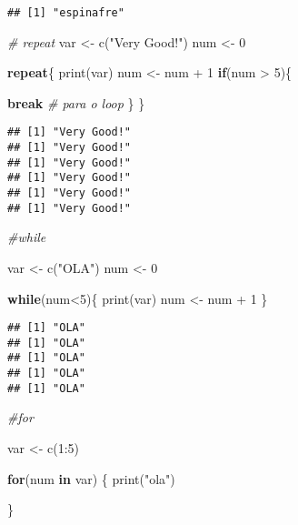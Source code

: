 \documentclass[
]{article}
\newenvironment{Shaded}{\begin{snugshade}}{\end{snugshade}}
\newcommand{\CommentTok}[1]{\textcolor[rgb]{0.56,0.35,0.01}{\textit{#1}}}
\newcommand{\ControlFlowTok}[1]{\textcolor[rgb]{0.13,0.29,0.53}{\textbf{#1}}}
\newcommand{\DecValTok}[1]{\textcolor[rgb]{0.00,0.00,0.81}{#1}}
\newcommand{\FunctionTok}[1]{\textcolor[rgb]{0.00,0.00,0.00}{#1}}
\newcommand{\NormalTok}[1]{#1}
\newcommand{\OtherTok}[1]{\textcolor[rgb]{0.56,0.35,0.01}{#1}}
\newcommand{\SpecialCharTok}[1]{\textcolor[rgb]{0.00,0.00,0.00}{#1}}
\newcommand{\StringTok}[1]{\textcolor[rgb]{0.31,0.60,0.02}{#1}}
\begin{document}
\begin{verbatim}
## [1] "espinafre"
\end{verbatim}

\begin{Shaded}
\begin{Highlighting}[]
\CommentTok{\# repeat}
\NormalTok{var }\OtherTok{\textless{}{-}} \FunctionTok{c}\NormalTok{(}\StringTok{"Very Good!"}\NormalTok{)}
\NormalTok{num }\OtherTok{\textless{}{-}} \DecValTok{0}

\ControlFlowTok{repeat}\NormalTok{\{}
  \FunctionTok{print}\NormalTok{(var)}
\NormalTok{  num }\OtherTok{\textless{}{-}}\NormalTok{ num }\SpecialCharTok{+} \DecValTok{1}
  \ControlFlowTok{if}\NormalTok{(num }\SpecialCharTok{\textgreater{}} \DecValTok{5}\NormalTok{)\{}
    
    \ControlFlowTok{break} \CommentTok{\# para o loop}
\NormalTok{  \}}
\NormalTok{\}}
\end{Highlighting}
\end{Shaded}

\begin{verbatim}
## [1] "Very Good!"
## [1] "Very Good!"
## [1] "Very Good!"
## [1] "Very Good!"
## [1] "Very Good!"
## [1] "Very Good!"
\end{verbatim}

\begin{Shaded}
\begin{Highlighting}[]
\CommentTok{\#while}

\NormalTok{var }\OtherTok{\textless{}{-}} \FunctionTok{c}\NormalTok{(}\StringTok{"OLA"}\NormalTok{)}
\NormalTok{num }\OtherTok{\textless{}{-}} \DecValTok{0}

\ControlFlowTok{while}\NormalTok{(num}\SpecialCharTok{\textless{}}\DecValTok{5}\NormalTok{)\{}
  \FunctionTok{print}\NormalTok{(var)}
\NormalTok{  num }\OtherTok{\textless{}{-}}\NormalTok{ num }\SpecialCharTok{+} \DecValTok{1}
\NormalTok{\}}
\end{Highlighting}
\end{Shaded}

\begin{verbatim}
## [1] "OLA"
## [1] "OLA"
## [1] "OLA"
## [1] "OLA"
## [1] "OLA"
\end{verbatim}

\begin{Shaded}
\begin{Highlighting}[]
\CommentTok{\#for}

\NormalTok{var }\OtherTok{\textless{}{-}} \FunctionTok{c}\NormalTok{(}\DecValTok{1}\SpecialCharTok{:}\DecValTok{5}\NormalTok{)}

\ControlFlowTok{for}\NormalTok{(num }\ControlFlowTok{in}\NormalTok{ var)}
\NormalTok{\{}
  \FunctionTok{print}\NormalTok{(}\StringTok{"ola"}\NormalTok{)}
  
\NormalTok{\}}
\end{Highlighting}
\end{Shaded}
\end{document}
